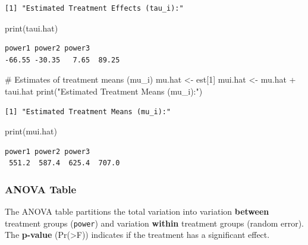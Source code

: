 \documentclass[
  letterpaper,
  DIV=11,
  numbers=noendperiod]{scrreprt}
\newenvironment{Shaded}{\begin{snugshade}}{\end{snugshade}}
\newcommand{\CommentTok}[1]{\textcolor[rgb]{0.37,0.37,0.37}{#1}}
\newcommand{\DecValTok}[1]{\textcolor[rgb]{0.68,0.00,0.00}{#1}}
\newcommand{\FunctionTok}[1]{\textcolor[rgb]{0.28,0.35,0.67}{#1}}
\newcommand{\NormalTok}[1]{\textcolor[rgb]{0.00,0.23,0.31}{#1}}
\newcommand{\OtherTok}[1]{\textcolor[rgb]{0.00,0.23,0.31}{#1}}
\newcommand{\SpecialCharTok}[1]{\textcolor[rgb]{0.37,0.37,0.37}{#1}}
\newcommand{\StringTok}[1]{\textcolor[rgb]{0.13,0.47,0.30}{#1}}
\begin{document}
\begin{verbatim}
[1] "Estimated Treatment Effects (tau_i):"
\end{verbatim}

\begin{Shaded}
\begin{Highlighting}[]
\FunctionTok{print}\NormalTok{(taui.hat)}
\end{Highlighting}
\end{Shaded}

\begin{verbatim}
power1 power2 power3        
-66.55 -30.35   7.65  89.25 
\end{verbatim}

\begin{Shaded}
\begin{Highlighting}[]
\CommentTok{\# Estimates of treatment means (mu\_i)}
\NormalTok{mu.hat }\OtherTok{\textless{}{-}}\NormalTok{ est[}\DecValTok{1}\NormalTok{]}
\NormalTok{mui.hat }\OtherTok{\textless{}{-}}\NormalTok{ mu.hat }\SpecialCharTok{+}\NormalTok{ taui.hat}
\FunctionTok{print}\NormalTok{(}\StringTok{"Estimated Treatment Means (mu\_i):"}\NormalTok{)}
\end{Highlighting}
\end{Shaded}

\begin{verbatim}
[1] "Estimated Treatment Means (mu_i):"
\end{verbatim}

\begin{Shaded}
\begin{Highlighting}[]
\FunctionTok{print}\NormalTok{(mui.hat)}
\end{Highlighting}
\end{Shaded}

\begin{verbatim}
power1 power2 power3        
 551.2  587.4  625.4  707.0 
\end{verbatim}

\subsubsection{ANOVA Table}\label{anova-table}

The ANOVA table partitions the total variation into variation
\textbf{between} treatment groups (\texttt{power}) and variation
\textbf{within} treatment groups (random error). The \textbf{p-value}
(Pr(\textgreater F)) indicates if the treatment has a significant
effect.
\end{document}
